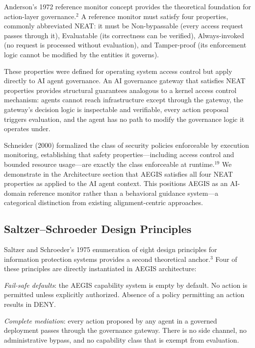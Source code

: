 \documentclass{IEEEcsmag}
\begin{document}
Anderson's 1972 reference monitor concept provides the theoretical foundation for action-layer governance.$^{2}$ A reference monitor must satisfy four properties, commonly abbreviated NEAT: it must be Non-bypassable (every access request passes through it), Evaluatable (its correctness can be verified), Always-invoked (no request is processed without evaluation), and Tamper-proof (its enforcement logic cannot be modified by the entities it governs).

These properties were defined for operating system access control but apply directly to AI agent governance. An AI governance gateway that satisfies NEAT properties provides structural guarantees analogous to a kernel access control mechanism: agents cannot reach infrastructure except through the gateway, the gateway's decision logic is inspectable and verifiable, every action proposal triggers evaluation, and the agent has no path to modify the governance logic it operates under.

Schneider (2000) formalized the class of security policies enforceable by execution monitoring, establishing that safety properties---including access control and bounded resource usage---are exactly the class enforceable at runtime.$^{19}$ We demonstrate in the Architecture section that AEGIS satisfies all four NEAT properties as applied to the AI agent context. This positions AEGIS as an AI-domain reference monitor rather than a behavioral guidance system---a categorical distinction from existing alignment-centric approaches.

\subsection{Saltzer--Schroeder Design Principles}

Saltzer and Schroeder's 1975 enumeration of eight design principles for information protection systems provides a second theoretical anchor.$^{3}$ Four of these principles are directly instantiated in AEGIS architecture:

{\it Fail-safe defaults}: the AEGIS capability system is empty by default. No action is permitted unless explicitly authorized. Absence of a policy permitting an action results in DENY.

{\it Complete mediation}: every action proposed by any agent in a governed deployment passes through the governance gateway. There is no side channel, no administrative bypass, and no capability class that is exempt from evaluation.
\end{document}
